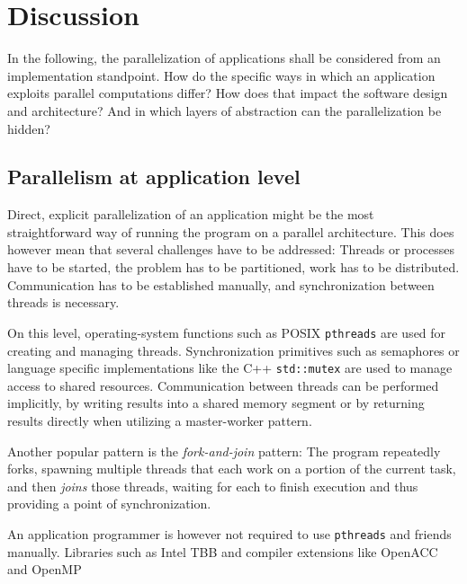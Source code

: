 \documentclass[BCOR20mm,DIV14,10pt,headinclude,footexclude,bibtotoc,liststotoc]{article}
\begin{document}
\section{Discussion}

In the following, the parallelization of applications shall be considered from
an implementation standpoint. How do the specific ways in which an application
exploits parallel computations differ? How does that impact the software design
and architecture? And in which layers of abstraction can the parallelization be
hidden?



\subsection{Parallelism at application level}

Direct, explicit parallelization of an application might be the most
straightforward way of running the program on a parallel architecture. This does
however mean that several challenges have to be addressed: Threads or processes
have to be started, the problem has to be partitioned, work has to be
distributed. Communication has to be established manually, and synchronization
between threads is necessary.

On this level, operating-system functions such as POSIX \texttt{pthreads} are
used for creating and managing threads. Synchronization primitives such as
semaphores or language specific implementations like the C++ \texttt{std::mutex}
are used to manage access to shared resources. Communication between threads can
be performed implicitly, by writing results into a shared memory segment or by
returning results directly when utilizing a master-worker pattern.

Another popular pattern is the \emph{fork-and-join} pattern: The program
repeatedly forks, spawning multiple threads that each work on a portion of the
current task, and then \emph{joins} those threads, waiting for each to finish
execution and thus providing a point of synchronization.

An application programmer is however not required to use \texttt{pthreads} and
friends manually. Libraries such as Intel TBB and compiler extensions like
OpenACC \cite{openacc} and OpenMP \cite{openmp}
\end{document}
